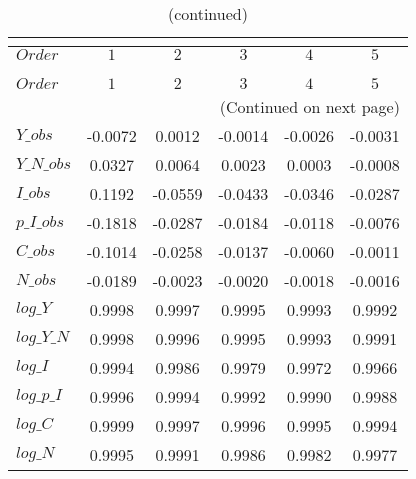  
\begin{center}
\begin{longtable}{lccccc} 
\caption{COEFFICIENTS OF AUTOCORRELATION}\\
 \label{Table:th_autocorr_matrix}\\
\toprule 
$Order      $	 & 	 $          1$	 & 	 $          2$	 & 	 $          3$	 & 	 $          4$	 & 	 $          5$\\
\midrule \endfirsthead 
\caption{(continued)}\\
 \toprule \\ 
$Order      $	 & 	 $          1$	 & 	 $          2$	 & 	 $          3$	 & 	 $          4$	 & 	 $          5$\\
\midrule \endhead 
\midrule \multicolumn{6}{r}{(Continued on next page)} \\ \bottomrule \endfoot 
\bottomrule \endlastfoot 
$Y\_obs     $	 & 	    -0.0072	 & 	     0.0012	 & 	    -0.0014	 & 	    -0.0026	 & 	    -0.0031 \\ 
$Y\_N\_obs  $	 & 	     0.0327	 & 	     0.0064	 & 	     0.0023	 & 	     0.0003	 & 	    -0.0008 \\ 
$I\_obs     $	 & 	     0.1192	 & 	    -0.0559	 & 	    -0.0433	 & 	    -0.0346	 & 	    -0.0287 \\ 
$p\_I\_obs  $	 & 	    -0.1818	 & 	    -0.0287	 & 	    -0.0184	 & 	    -0.0118	 & 	    -0.0076 \\ 
$C\_obs     $	 & 	    -0.1014	 & 	    -0.0258	 & 	    -0.0137	 & 	    -0.0060	 & 	    -0.0011 \\ 
$N\_obs     $	 & 	    -0.0189	 & 	    -0.0023	 & 	    -0.0020	 & 	    -0.0018	 & 	    -0.0016 \\ 
$log\_Y     $	 & 	     0.9998	 & 	     0.9997	 & 	     0.9995	 & 	     0.9993	 & 	     0.9992 \\ 
$log\_Y\_N  $	 & 	     0.9998	 & 	     0.9996	 & 	     0.9995	 & 	     0.9993	 & 	     0.9991 \\ 
$log\_I     $	 & 	     0.9994	 & 	     0.9986	 & 	     0.9979	 & 	     0.9972	 & 	     0.9966 \\ 
$log\_p\_I  $	 & 	     0.9996	 & 	     0.9994	 & 	     0.9992	 & 	     0.9990	 & 	     0.9988 \\ 
$log\_C     $	 & 	     0.9999	 & 	     0.9997	 & 	     0.9996	 & 	     0.9995	 & 	     0.9994 \\ 
$log\_N     $	 & 	     0.9995	 & 	     0.9991	 & 	     0.9986	 & 	     0.9982	 & 	     0.9977 \\ 
\end{longtable}
 \end{center}
